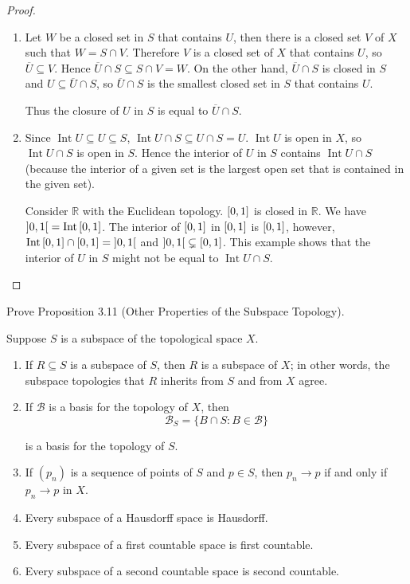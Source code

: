 \begin{proof}
	\begin{enumerate}[label={(\alph*)}]
		\item Let $W$ be a closed set in $S$ that contains $U$, then there is a closed set $V$ of $X$ such that $W = S\cap V$. Therefore $V$ is a closed set of $X$ that contains $U$, so $\overline{U}\subseteq V$. Hence $\overline{U}\cap S\subseteq S\cap V = W$. On the other hand, $\overline{U}\cap S$ is closed in $S$ and $U\subseteq \overline{U}\cap S$, so $\overline{U}\cap S$ is the smallest closed set in $S$ that contains $U$.

		      Thus the closure of $U$ in $S$ is equal to $\overline{U}\cap S$.
		\item Since $\operatorname{Int} U\subseteq U\subseteq S$, $\operatorname{Int}U\cap S\subseteq U\cap S = U$. $\operatorname{Int}U$ is open in $X$, so $\operatorname{Int} U\cap S$ is open in $S$. Hence the interior of $U$ in $S$ contains $\operatorname{Int}U\cap S$ (because the interior of a given set is the largest open set that is contained in the given set).

		      Consider $\mathbb{R}$ with the Euclidean topology. $\left[{0,1}\right]$ is closed in $\mathbb{R}$. We have $\left]{0, 1}\right[ = \operatorname{Int}\left[{0, 1}\right]$. The interior of $\left[{0,1}\right]$ in $\left[{0,1}\right]$ is $\left[{0,1}\right]$, however, $\operatorname{Int}\left[{0,1}\right]\cap \left[{0,1}\right] = \left]{0,1}\right[$ and $\left]{0,1}\right[\subsetneq\left[{0,1}\right]$. This example shows that the interior of $U$ in $S$ might not be equal to $\operatorname{Int} U\cap S$.
	\end{enumerate}
\end{proof}

\begin{exercise}{3.12}
	Prove Proposition 3.11 (Other Properties of the Subspace Topology).

	Suppose $S$ is a subspace of the topological space $X$.
	\begin{enumerate}[label={(\alph*)}]
		\item If $R\subseteq S$ is a subspace of $S$, then $R$ is a subspace of $X$; in other words, the subspace topologies that $R$ inherits from $S$ and from $X$ agree.
		\item If $\mathscr{B}$ is a basis for the topology of $X$, then
		      \[
			      \mathscr{B}_{S} = \{ B\cap S: B\in\mathscr{B} \}
		      \]

		      is a basis for the topology of $S$.
		\item If ${(p_{n})}$ is a sequence of points of $S$ and $p\in S$, then $p_{n}\to p$ if and only if $p_{n}\to p$ in $X$.
		\item Every subspace of a Hausdorff space is Hausdorff.
		\item Every subspace of a first countable space is first countable.
		\item Every subspace of a second countable space is second countable.
	\end{enumerate}
\end{exercise}

